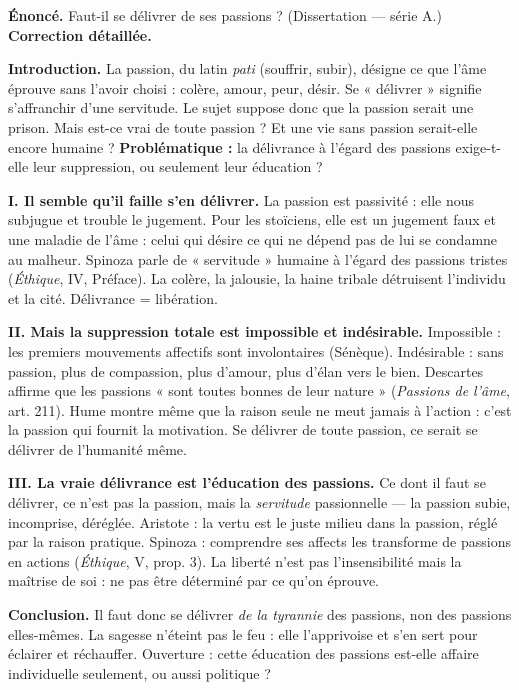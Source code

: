 \documentclass[11pt]{article}
\begin{document}
\begin{exoresolu}
\textbf{Énoncé.} Faut-il se délivrer de ses passions ? (Dissertation — série A.)
\tcblower
\textbf{Correction détaillée.}

\textbf{Introduction.} La passion, du latin \emph{pati} (souffrir, subir), désigne ce que l'âme éprouve sans l'avoir choisi : colère, amour, peur, désir. Se « délivrer » signifie s'affranchir d'une servitude. Le sujet suppose donc que la passion serait une prison. Mais est-ce vrai de toute passion ? Et une vie sans passion serait-elle encore humaine ? \textbf{Problématique :} la délivrance à l'égard des passions exige-t-elle leur suppression, ou seulement leur éducation ?

\textbf{I. Il semble qu'il faille s'en délivrer.} La passion est passivité : elle nous subjugue et trouble le jugement. Pour les stoïciens, elle est un jugement faux et une maladie de l'âme : celui qui désire ce qui ne dépend pas de lui se condamne au malheur. Spinoza parle de « servitude » humaine à l'égard des passions tristes (\emph{Éthique}, IV, Préface). La colère, la jalousie, la haine tribale détruisent l'individu et la cité. Délivrance = libération.

\textbf{II. Mais la suppression totale est impossible et indésirable.} Impossible : les premiers mouvements affectifs sont involontaires (Sénèque). Indésirable : sans passion, plus de compassion, plus d'amour, plus d'élan vers le bien. Descartes affirme que les passions « sont toutes bonnes de leur nature » (\emph{Passions de l'âme}, art. 211). Hume montre même que la raison seule ne meut jamais à l'action : c'est la passion qui fournit la motivation. Se délivrer de toute passion, ce serait se délivrer de l'humanité même.

\textbf{III. La vraie délivrance est l'éducation des passions.} Ce dont il faut se délivrer, ce n'est pas la passion, mais la \emph{servitude} passionnelle — la passion subie, incomprise, déréglée. Aristote : la vertu est le juste milieu dans la passion, réglé par la raison pratique. Spinoza : comprendre ses affects les transforme de passions en actions (\emph{Éthique}, V, prop. 3). La liberté n'est pas l'insensibilité mais la maîtrise de soi : ne pas être déterminé par ce qu'on éprouve.

\textbf{Conclusion.} Il faut donc se délivrer \emph{de la tyrannie} des passions, non des passions elles-mêmes. La sagesse n'éteint pas le feu : elle l'apprivoise et s'en sert pour éclairer et réchauffer. Ouverture : cette éducation des passions est-elle affaire individuelle seulement, ou aussi politique ?
\end{exoresolu}
\end{document}

